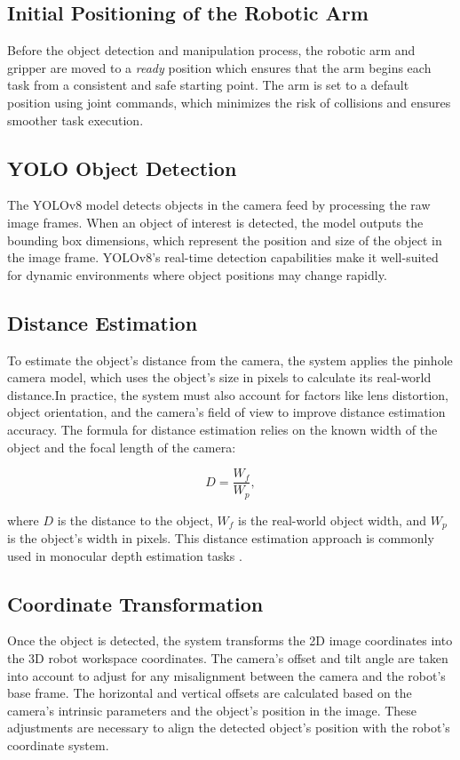 \subsection{Initial Positioning of the Robotic Arm}
Before the object detection and manipulation process, the robotic arm and gripper are moved to a \textit{ready} position which ensures that the arm begins each task from a consistent and safe starting point. The arm is set to a default position using joint commands, which minimizes the risk of collisions and ensures smoother task execution.

\subsection{YOLO Object Detection}
The YOLOv8 model detects objects in the camera feed by processing the raw image frames. When an object of interest is detected, the model outputs the bounding box dimensions, which represent the position and size of the object in the image frame. YOLOv8’s real-time detection capabilities make it well-suited for dynamic environments where object positions may change rapidly.

\subsection{Distance Estimation}
To estimate the object’s distance from the camera, the system applies the pinhole camera model, which uses the object’s size in pixels to calculate its real-world distance.In practice, the system must also account for factors like lens distortion, object orientation, and the camera’s field of view to improve distance estimation accuracy. The formula for distance estimation relies on the known width of the object and the focal length of the camera:

\begin{equation}
    D = \frac{W_f}{W_p},
\end{equation}

where $D$ is the distance to the object, $W_f$ is the real-world object width, and $W_p$ is the object’s width in pixels. This distance estimation approach is commonly used in monocular depth estimation tasks \cite{godard2017unsupervisedmonoculardepthestimation}.

\subsection{Coordinate Transformation}
Once the object is detected, the system transforms the 2D image coordinates into the 3D robot workspace coordinates. The camera's offset and tilt angle are taken into account to adjust for any misalignment between the camera and the robot’s base frame. The horizontal and vertical offsets are calculated based on the camera's intrinsic parameters and the object’s position in the image. These adjustments are necessary to align the detected object’s position with the robot's coordinate system.

